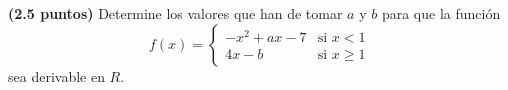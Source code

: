 
\textbf{(2.5 puntos)} Determine los valores que han de tomar $a$ y $b$ para que la función
\[
f(x)=\begin{cases}
-x^2+ax-7&\text{si }x<1\\
4x-b&\text{si }x\geq1
\end{cases}
\]
sea derivable en $R$.
